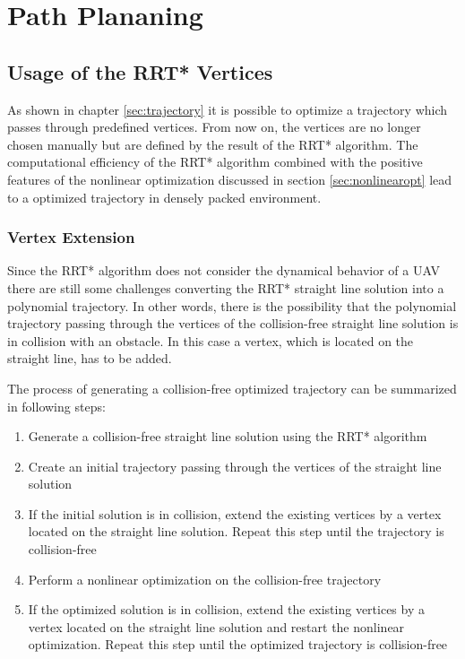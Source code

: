 \chapter{Path Plananing}\label{chap:Planning}

\section{Usage of the RRT* Vertices}

As shown in chapter \ref{sec:trajectory} it is possible to optimize a trajectory which passes through predefined vertices. From now on, the vertices are no longer chosen manually but are defined by the result of the RRT* algorithm. The computational efficiency of the RRT* algorithm combined with the positive features of the nonlinear optimization discussed in section \ref{sec:nonlinearopt} lead to a optimized trajectory in densely packed environment.

\subsection{Vertex Extension}


Since the RRT* algorithm does not consider the dynamical behavior of a UAV there are still some challenges converting the RRT* straight line solution into a polynomial trajectory. In other words, there is the possibility that the polynomial trajectory passing through the vertices of the collision-free straight line solution is in collision with an obstacle. In this case a vertex, which is located on the straight line, has to be added. \newline

The process of generating a collision-free optimized trajectory can be summarized in following steps:


\begin{enumerate}
  \item Generate a collision-free straight line solution using the RRT* algorithm
  \item Create an initial trajectory passing through the vertices of the straight line solution
  \item If the initial solution is in collision, extend the existing vertices by a vertex located on the straight line solution. Repeat this step until the trajectory is collision-free
\item Perform a nonlinear optimization on the collision-free trajectory
\item If the optimized solution is in collision, extend the existing vertices by a vertex located on the straight line solution and restart the nonlinear optimization. Repeat this step until the optimized trajectory is collision-free
\end{enumerate}


